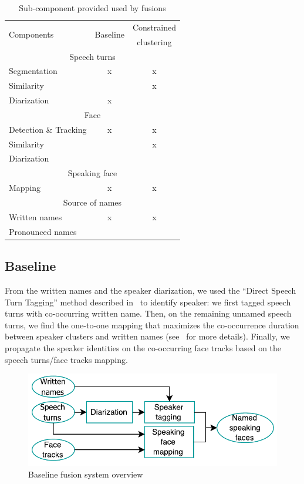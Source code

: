 \documentclass{acm_proc_article-me}
\begin{document}
\begin{table}[ht]
  \centering
  \begin{tabular}{|l|c|c|}
    \hline
	\multirow{2}{*}{Components}	& \multirow{2}{*}{Baseline}	& Constrained 		\\
									&							& clustering 		\\
	\hline
	\hline
	\multicolumn{3}{|c|}{Speech turns}												\\
	\hline
	Segmentation						&			x				&		x			\\
	Similarity						&							&		x			\\
	Diarization						&			x				&					\\
	\hline
	\multicolumn{3}{|c|}{Face}														\\
	\hline
	Detection \& Tracking			&			x				&		x			\\
	Similarity						&							&		x			\\
	Diarization						&							&					\\
	\hline
	\multicolumn{3}{|c|}{Speaking face}												\\
	\hline
	Mapping							&			x				&		x			\\
	\hline
	\multicolumn{3}{|c|}{Source of names}											\\
	\hline
	Written names~\cite{POIGNANT--ICME--2012}	&		x		&		x			\\
	Pronounced names~\cite{LAMEL--IWSLT--2011, DIANRELLI--IJCNLP--2011}	&	&		\\
	\hline
  \end{tabular}
  \caption{Sub-component provided used by fusions}
  \label{tab:subcomp}
\end{table}


\subsection{Baseline}

From the written names and the speaker diarization, we used the ``Direct Speech Turn Tagging'' method described in~\cite{POIGNANT--INTERSPEECH--2012} to identify speaker: we first tagged speech turns with co-occurring written name. Then, on the remaining unnamed speech turns, we find the one-to-one mapping that maximizes the co-occurrence duration between speaker clusters and written names (see~\cite{POIGNANT--INTERSPEECH--2012} for more details). Finally, we propagate the speaker identities on the co-occurring face tracks based on the speech turns/face tracks mapping.

\begin{figure}[htb]
 \centering
 \includegraphics[width=0.9\linewidth]{figs/baseline.pdf}
 \caption {Baseline fusion system overview}
 \label{fig:gene}
\end{figure}
\end{document}
